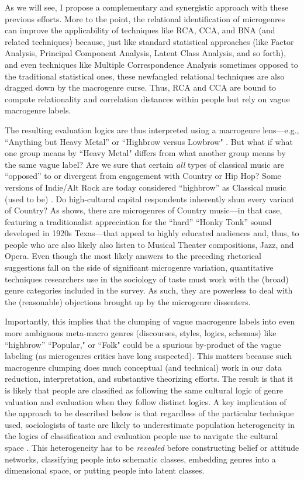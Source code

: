 \documentclass[a4paper,12pt]{article}
\begin{document}
As we will see, I propose a complementary and synergistic approach with these previous efforts. More to the point, the relational identification of microgenres can improve the applicability of techniques like RCA, CCA, and BNA (and related techniques) because, just like standard statistical approaches (like Factor Analysis, Principal Component Analysis, Latent Class Analysis, and so forth), and even techniques like Multiple Correspondence Analysis sometimes opposed to the traditional statistical ones, these newfangled relational techniques are also dragged down by the macrogenre curse. Thus, RCA and CCA are bound to compute relationality and correlation distances within people but rely on vague macrogenre labels. 

The resulting evaluation logics are thus interpreted using a macrogenre lens---e.g., ``Anything but Heavy Metal'' or ``Highbrow versus Lowbrow" \citep[e.g.,][]{goldberg2011mapping, willekens2022cultural}. But what if what one group means by ``Heavy Metal" differs from what another group means by the same vague label? Are we sure that certain {\em all} types of classical music are ``opposed'' to or divergent from engagement with Country or Hip Hop? Some versions of Indie/Alt Rock are today considered ``highbrow'' as Classical music (used to be) \citep{Van_Poecke2018}. Do high-cultural capital respondents inherently shun every variant of Country? As \citet{lembo2017three} shows, there are microgenres of Country music---in that case, featuring a traditionalist appreciation for the ``hard'' ``Honky Tonk'' sound developed in 1920s Texas---that appeal to highly educated audiences and, thus, to people who are also likely also listen to Musical Theater compositions, Jazz, and Opera. Even though the most likely answers to the preceding rhetorical suggestions fall on the side of significant microgenre variation, quantitative techniques researchers use in the sociology of taste must work with the (broad) genre categories included in the survey. As such, they are powerless to deal with the (reasonable) objections brought up by the microgenre dissenters. 

Importantly, this implies that the clumping of vague macrogenre labels into even more ambiguous meta-macro genres (discourses, styles, logics, schemas) like ``highbrow'' ``Popular," or ``Folk" could be a spurious by-product of the vague labeling (as microgenres critics have long suspected). This matters because such macrogenre clumping does much conceptual (and technical) work in our data reduction, interpretation, and substantive theorizing efforts. The result is that it is likely that people are classified as following the same cultural logic of genre valuation and evaluation when they follow distinct logics. A key implication of the approach to be described below is that regardless of the particular technique used, sociologists of taste are likely to underestimate population heterogeneity in the logics of classification and evaluation people use to navigate the cultural space \citep{lahire2008individual}. This heterogeneity has to be {\em revealed} before constructing belief or attitude networks, classifying people into schematic classes, embedding genres into a dimensional space, or putting people into latent classes.
\end{document}
